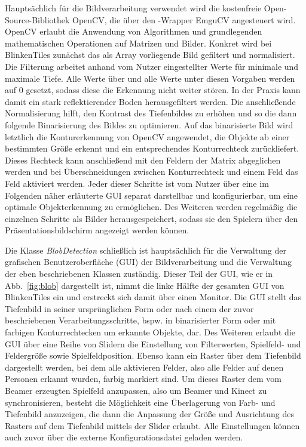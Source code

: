 Hauptsächlich für die Bildverarbeitung verwendet wird die kostenfreie Open-Source-Bibliothek OpenCV, die über den \CS{}-Wrapper EmguCV angesteuert wird. OpenCV erlaubt die Anwendung von Algorithmen und grundlegenden mathematischen Operationen auf Matrizen und Bilder. Konkret wird bei BlinkenTiles zunächst das als Array vorliegende Bild gefiltert und normalisiert. Die Filterung arbeitet anhand vom Nutzer eingestellter Werte für minimale und maximale Tiefe. Alle Werte über und alle Werte unter diesen Vorgaben werden auf 0 gesetzt, sodass diese die Erkennung nicht weiter stören. In der Praxis kann damit ein stark reflektierender Boden herausgefiltert werden. Die anschließende Normalisierung hilft, den Kontrast des Tiefenbildes zu erhöhen und so die dann folgende Binarisierung des Bildes zu optimieren. Auf das binarisierte Bild wird letztlich die Konturerkennung von OpenCV angewendet, die Objekte ab einer bestimmten Größe erkennt und ein entsprechendes Konturrechteck zurückliefert. Dieses Rechteck kann anschließend mit den Feldern der Matrix abgeglichen werden und bei Überschneidungen zwischen Konturrechteck und einem Feld das Feld aktiviert werden. Jeder dieser Schritte ist vom Nutzer über eine im Folgenden näher erläuterte GUI separat darstellbar und konfigurierbar, um eine optimale Objekterkennung zu ermöglichen. Des Weiteren werden regelmäßig die einzelnen Schritte als Bilder herausgespeichert, sodass sie den Spielern über den Präsentationsbildschirm angezeigt werden können.

Die Klasse \emph{BlobDetection} schließlich ist hauptsächlich für die Verwaltung der grafischen Benutzeroberfläche (GUI) der Bildverarbeitung und die Verwaltung der eben beschriebenen Klassen zuständig. Dieser Teil der GUI, wie er in Abb.~\ref{fig:blob} dargestellt ist, nimmt die linke Hälfte der gesamten GUI von BlinkenTiles ein und erstreckt sich damit über einen Monitor. Die GUI stellt das Tiefenbild in seiner ursprünglichen Form oder nach einem der zuvor beschriebenen Verarbeitungsschritte, bspw. in binarisierter Form oder mit farbigen Konturrechtecken um erkannte Objekte, dar. Des Weiteren erlaubt die GUI über eine Reihe von Slidern die Einstellung von Filterwerten, Spielfeld- und Feldergröße sowie Spielfeldposition. Ebenso kann ein Raster über dem Tiefenbild dargestellt werden, bei dem alle aktivieren Felder, also alle Felder auf denen Personen erkannt wurden, farbig markiert sind. Um dieses Raster dem vom Beamer erzeugten Spielfeld anzupassen, also um Beamer und Kinect zu synchronisieren, besteht die Möglichkeit eine Überlagerung von Farb- und Tiefenbild anzuzeigen, die dann die Anpassung der Größe und Ausrichtung des Rasters auf dem Tiefenbild mittels der Slider erlaubt. Alle Einstellungen können auch zuvor über die externe Konfigurationsdatei geladen werden.

